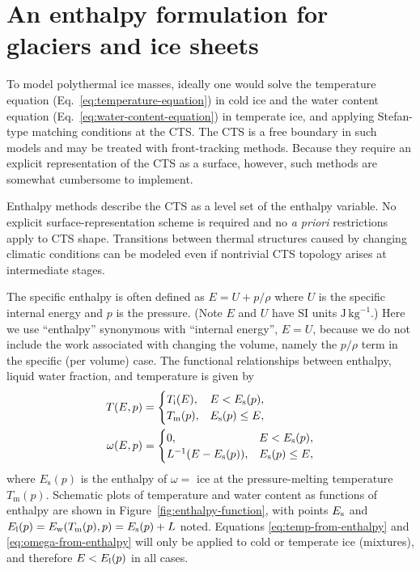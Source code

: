 \documentclass[parskip=half]{scrartcl}
\begin{document}
\section{An enthalpy formulation for glaciers and ice sheets}

To model polythermal ice masses, ideally one would solve the temperature equation (Eq.~\ref{eq:temperature-equation}) in cold ice and the water content equation (Eq.~\ref{eq:water-content-equation}) in temperate ice, and applying Stefan-type matching conditions at the CTS. The CTS is a free boundary in such models and may be treated with front-tracking methods.  Because they require an explicit representation of the CTS as a surface, however, such methods are somewhat cumbersome to implement. 

Enthalpy methods describe the CTS as a level set of the enthalpy variable.  No explicit surface-representation scheme is required and no \emph{a priori} restrictions apply to CTS shape.  Transitions between thermal structures caused by changing climatic conditions can be modeled even if nontrivial CTS topology arises at intermediate stages.

The specific enthalpy is often defined as $E = U + p/\rho$ where $U$ is the specific internal energy and $p$ is the pressure.  (Note $E$ and $U$ have SI units $\text{J}\,\text{kg}^{-1}$.) Here we use ``enthalpy'' synonymous with ``internal energy'', $E=U$, because we do not include the work associated with changing the volume, namely the $p/\rho$ term in the specific (per volume) case. The functional relationships between enthalpy, liquid water fraction, and temperature is given by
\begin{align}
\label{eq:temp-from-enthalpy}
T(E,p) &= \begin{cases}
          T_{\text i}(E),     & E < E_{\text s}(p), \\
          T_{\text m}(p),     & E_{\text s}(p) \le E,
        \end{cases} \\
\label{eq:omega-from-enthalpy}
\omega(E,p) &= \begin{cases}
          0,                       & E < E_{\text s}(p), \\
          L^{-1} ( E-E_\text{s}(p) ), & E_{\text s}(p) \le E,
        \end{cases}
\end{align} where $E_{\text{s}}(p)$ is the enthalpy of $\omega=$ ice at the pressure-melting temperature $T_{\text{m}}(p)$. Schematic plots of temperature and water content as functions of enthalpy are shown in Figure~\ref{fig:enthalpy-function}, with points $E_{\text s}$ and $E_{\text l}(p) = E_{\text w}(T_{\text m}(p),p) = E_{\text s}(p) + L$ noted.   Equations \eqref{eq:temp-from-enthalpy} and \eqref{eq:omega-from-enthalpy} will only be applied to cold or temperate ice (mixtures), and therefore $E<E_{\text l}(p)$ in all cases.
\end{document}
